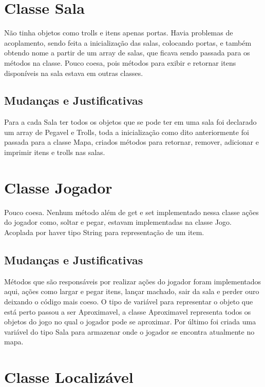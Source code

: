 \documentclass[runningheads,a4paper]{llncs}
\begin{document}
\section{Classe Sala}

Não tinha objetos como trolls e itens apenas portas. Havia problemas de acoplamento, sendo feita a inicialização das salas, colocando portas, e também obtendo nome a partir de um array de salas, que ficava sendo passada para os métodos na classe. Pouco coesa, pois métodos para exibir e retornar itens disponíveis na sala estava em outras classes.

\subsection{Mudanças e Justificativas}

Para a cada Sala ter todos os objetos que se pode ter em uma sala foi declarado um array de Pegavel e Trolls, toda a inicialização como dito anteriormente foi passada para a classe Mapa, criados métodos para retornar, remover, adicionar e imprimir itens e trolls nas salas.

\section{Classe Jogador}

Pouco coesa. Nenhum método além de get e set implementado nessa classe ações do jogador como, soltar e pegar, estavam implementadas na classe Jogo. Acoplada por haver tipo String para representação de um item.

\subsection{Mudanças e Justificativas}

Métodos que são responsáveis por realizar ações do jogador foram implementados aqui, ações como largar e pegar itens, lançar machado, sair da sala e perder ouro deixando o código mais coeso. O tipo de variável para representar o objeto que está perto passou a ser Aproximavel, a classe Aproximavel representa todos os objetos do jogo no qual o jogador pode se aproximar. Por último foi criada uma variável do tipo Sala para armazenar onde o jogador se encontra atualmente no mapa. 

\section{Classe Localizável}
\end{document}
